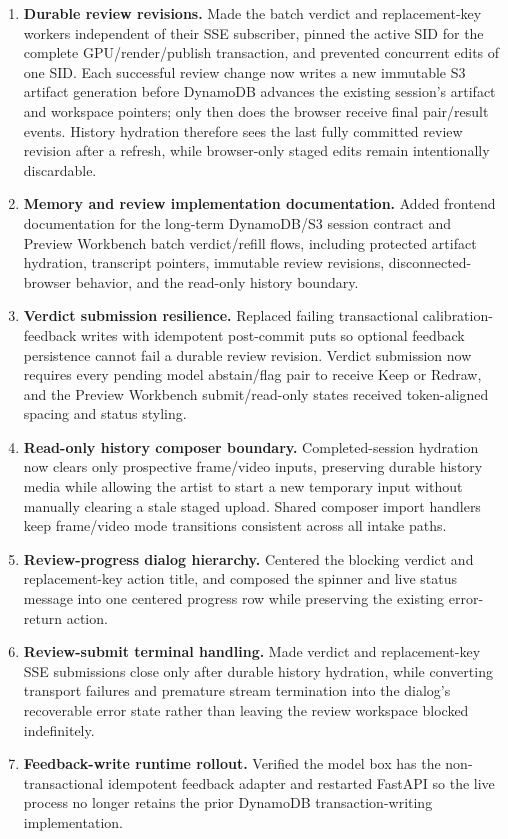 \begin{enumerate}
  \item \textbf{Durable review revisions.} Made the batch verdict and replacement-key workers independent of their SSE subscriber, pinned the active SID for the complete GPU/render/publish transaction, and prevented concurrent edits of one SID. Each successful review change now writes a new immutable S3 artifact generation before DynamoDB advances the existing session's artifact and workspace pointers; only then does the browser receive final pair/result events. History hydration therefore sees the last fully committed review revision after a refresh, while browser-only staged edits remain intentionally discardable.
  \item \textbf{Memory and review implementation documentation.} Added frontend documentation for the long-term DynamoDB/S3 session contract and Preview Workbench batch verdict/refill flows, including protected artifact hydration, transcript pointers, immutable review revisions, disconnected-browser behavior, and the read-only history boundary.
  \item \textbf{Verdict submission resilience.} Replaced failing transactional calibration-feedback writes with idempotent post-commit puts so optional feedback persistence cannot fail a durable review revision. Verdict submission now requires every pending model abstain/flag pair to receive Keep or Redraw, and the Preview Workbench submit/read-only states received token-aligned spacing and status styling.
  \item \textbf{Read-only history composer boundary.} Completed-session hydration now clears only prospective frame/video inputs, preserving durable history media while allowing the artist to start a new temporary input without manually clearing a stale staged upload. Shared composer import handlers keep frame/video mode transitions consistent across all intake paths.
  \item \textbf{Review-progress dialog hierarchy.} Centered the blocking verdict and replacement-key action title, and composed the spinner and live status message into one centered progress row while preserving the existing error-return action.
  \item \textbf{Review-submit terminal handling.} Made verdict and replacement-key SSE submissions close only after durable history hydration, while converting transport failures and premature stream termination into the dialog's recoverable error state rather than leaving the review workspace blocked indefinitely.
  \item \textbf{Feedback-write runtime rollout.} Verified the model box has the non-transactional idempotent feedback adapter and restarted FastAPI so the live process no longer retains the prior DynamoDB transaction-writing implementation.

\end{enumerate}
